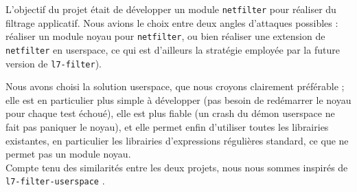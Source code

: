 L'objectif du projet était de développer un module \verb+netfilter+ pour réaliser du filtrage applicatif. Nous avions le choix entre deux angles d'attaques possibles : réaliser un module noyau pour \verb+netfilter+, ou bien réaliser une extension de \verb+netfilter+ en userspace, ce qui est d'ailleurs la stratégie employée par la future version de \verb+l7-filter+).

Nous avons choisi la solution userspace, que nous croyons clairement préférable ; elle est en particulier plus simple à développer (pas besoin de redémarrer le noyau pour chaque test échoué), elle est plus fiable (un crash du démon userspace ne fait pas paniquer le noyau), et elle permet enfin d'utiliser toutes les librairies existantes, en particulier les librairies d'expressions régulières standard, ce que ne permet pas un module noyau.\\

Compte tenu des similarités entre les deux projets, nous nous sommes inspirés de \verb+l7-filter-userspace+ \cite{RW}.

